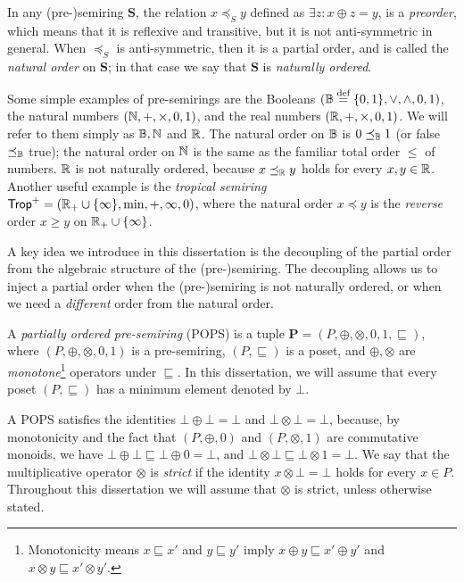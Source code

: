 In any (pre-)semiring $\bm S$, the relation $x \preceq_S y$ defined as
$\exists z: x \oplus z = y$, is a {\em preorder}, which means that it
is reflexive and transitive, but it is not anti-symmetric in general.
When $\preceq_S$ is anti-symmetric, then it is a partial order, and is
called the {\em natural order} on $\bm S$; in that case we say that
$\bm S$ is {\em naturally ordered}.

\begin{ex}
  Some simple examples of pre-semirings are the Booleans
  $(\mathbb B \stackrel{\text{def}}{=} \{0,1\}, \vee, \wedge, 0, 1)$, the natural numbers
  $(\mathbb N, +, \times , 0, 1)$, and the real numbers
  $(\mathbb R, +, \times, 0, 1)$.  We will refer to them simply as $\mathbb B, \mathbb N$
  and $\mathbb R$.  The natural order on $\mathbb B$ is $0 \preceq_\mathbb B 1$ (or {\sf
    false} $\preceq_\mathbb B$ {\sf true}); the natural order on $\mathbb N$ is the
  same as the familiar total order $\leq$ of numbers.  $\mathbb R$ is not
  naturally ordered, because $x \preceq_\mathbb R y$ holds for every
  $x,y \in \mathbb R$.  Another useful example is the {\em tropical semiring}
  $\text{\sf Trop}^+ = (\mathbb R_+ \cup \{\infty\}, \min,+, \infty, 0)$, where the
  natural order $x \preceq y$ is the {\em reverse} order $x \geq y$ on
  $\mathbb R_+ \cup \{\infty\}$.
\end{ex}


A key idea we introduce in this dissertation is the decoupling of the partial order from the
algebraic structure of the (pre-)semiring.
The decoupling allows us to inject a partial order when the (pre-)semiring is not
naturally ordered, or when we need a {\em different} order from the natural order.

\begin{defn}[POPS] \label{def:pops} A {\em partially ordered pre-semiring} (POPS) is a tuple
  $\bm P = (P, \oplus, \otimes, 0, 1, \sqsubseteq)$, where
  $(P, \oplus, \otimes, 0, 1)$ is a pre-semiring, $(P, \sqsubseteq)$
  is a poset, and $\oplus, \otimes$ are {\em monotone}\footnote{Monotonicity means
  $x\sqsubseteq x'$ and $y \sqsubseteq y'$ imply $x\oplus y \sqsubseteq x' \oplus y'$
  and $x \otimes y \sqsubseteq x' \otimes y'$.}
  operators under $\sqsubseteq$.
  In this dissertation, we will assume that every poset $(P, \sqsubseteq)$ has a minimum
  element denoted by $\bot$.
\end{defn}

A POPS satisfies the identities $\bot \oplus \bot = \bot$ and
$\bot \otimes \bot = \bot$, because, by monotonicity and the fact that
$(P,\oplus,0)$ and $(P,\otimes,1)$ are commutative monoids, we have
$\bot \oplus \bot \sqsubseteq \bot \oplus 0 = \bot$, and
$\bot \otimes \bot \sqsubseteq \bot \otimes 1 = \bot$.  We say that
the multiplicative operator $\otimes$ is {\em strict} if the identity
$x \otimes \bot = \bot$ holds for every $x \in P$.
Throughout this dissertation we will assume that $\otimes$ is strict,
unless otherwise stated.

